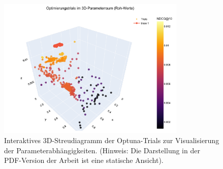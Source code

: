 
\begin{figure}[htbp]
    \centering
    \includegraphics[width=0.8\textwidth]{content/figures/svg/3d_scatter_plot.pdf}
    \caption{Interaktives 3D-Streudiagramm der Optuna-Trials zur Visualisierung der Parameterabhängigkeiten. (Hinweis: Die Darstellung in der PDF-Version der Arbeit ist eine statische Ansicht).}
    \label{fig:3d_scatter}
\end{figure}